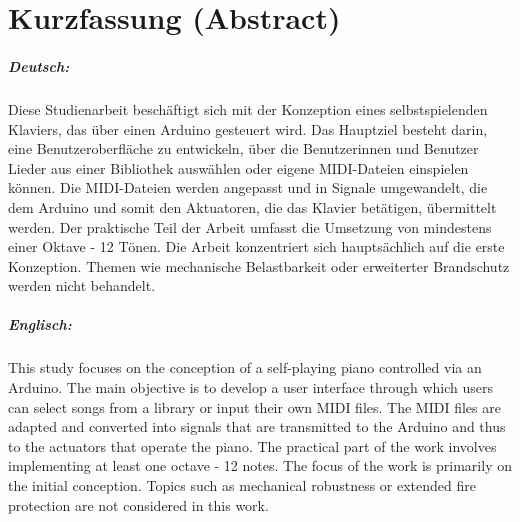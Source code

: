 
\chapter*{Kurzfassung (Abstract)}

\paragraph*{Deutsch:}

Diese Studienarbeit beschäftigt sich mit der Konzeption eines selbstspielenden Klaviers, das über einen Arduino gesteuert
wird. Das Hauptziel besteht darin, eine Benutzeroberfläche zu entwickeln, über die Benutzerinnen und Benutzer Lieder
aus einer Bibliothek auswählen oder eigene MIDI-Dateien einspielen können. Die MIDI-Dateien werden angepasst und in
Signale umgewandelt, die dem Arduino und somit den Aktuatoren, die das Klavier betätigen, übermittelt werden. Der
praktische Teil der Arbeit umfasst die Umsetzung von mindestens einer Oktave - 12 Tönen. Die Arbeit konzentriert sich
hauptsächlich auf die erste Konzeption. Themen wie mechanische Belastbarkeit oder erweiterter Brandschutz werden nicht
behandelt.


\paragraph*{Englisch:}
This study focuses on the conception of a self-playing piano controlled via an Arduino. The main objective is to develop
a user interface through which users can select songs from a library or input their own MIDI files. The MIDI files are
adapted and converted into signals that are transmitted to the Arduino and thus to the actuators that operate the piano.
The practical part of the work involves implementing at least one octave - 12 notes. The focus of the work is primarily
on the initial conception. Topics such as mechanical robustness or extended fire protection are not considered in this
work.

